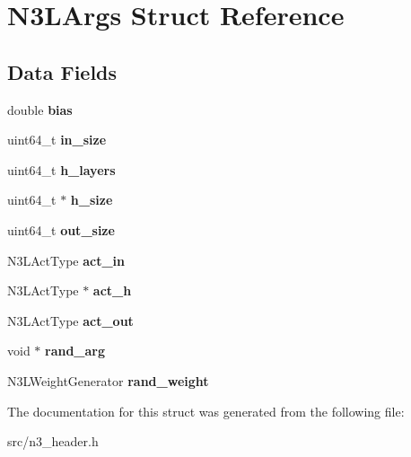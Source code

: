 \hypertarget{structN3LArgs}{}\section{N3\+L\+Args Struct Reference}
\label{structN3LArgs}
\subsection*{Data Fields}
\begin{DoxyCompactItemize}
\item 
\mbox{\label{structN3LArgs_ad51d108eba4b55f7fc49174724fbacad}} 
double {\bfseries bias}
\item 
\mbox{\label{structN3LArgs_afbd19ab7f7afe11e440f46d293a0f6dc}} 
uint64\+\_\+t {\bfseries in\+\_\+size}
\item 
\mbox{\label{structN3LArgs_acbb947695cd6db88658a2a6fa78c1682}} 
uint64\+\_\+t {\bfseries h\+\_\+layers}
\item 
\mbox{\label{structN3LArgs_ae875ef755586a29387def48249c98d81}} 
uint64\+\_\+t $\ast$ {\bfseries h\+\_\+size}
\item 
\mbox{\label{structN3LArgs_a63bb20896b0af109ea281998e5fd56ab}} 
uint64\+\_\+t {\bfseries out\+\_\+size}
\item 
\mbox{\label{structN3LArgs_abb810a671b7a1b20c161e81e309f843c}} 
N3\+L\+Act\+Type {\bfseries act\+\_\+in}
\item 
\mbox{\label{structN3LArgs_a968aa1ed194fc7bbfaac154bcbf8a405}} 
N3\+L\+Act\+Type $\ast$ {\bfseries act\+\_\+h}
\item 
\mbox{\label{structN3LArgs_ad9d17026b32668acea535143809b16c5}} 
N3\+L\+Act\+Type {\bfseries act\+\_\+out}
\item 
\mbox{\label{structN3LArgs_a9df79247b5160e5261683a535654cc18}} 
void $\ast$ {\bfseries rand\+\_\+arg}
\item 
\mbox{\label{structN3LArgs_ac6f4a8939deb104e8b154860904f3b45}} 
N3\+L\+Weight\+Generator {\bfseries rand\+\_\+weight}
\end{DoxyCompactItemize}


The documentation for this struct was generated from the following file\+:\begin{DoxyCompactItemize}
\item 
src/n3\+\_\+header.\+h\end{DoxyCompactItemize}
